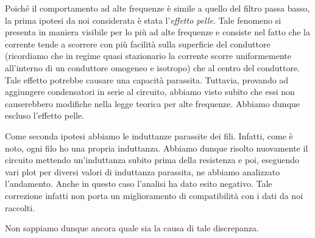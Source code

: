 Poiché il comportamento ad alte frequenze è simile a quello del filtro passa basso, la prima ipotesi da noi considerata è stata l'\emph{effetto pelle}. Tale fenomeno si presenta in maniera visibile per lo più ad alte frequenze e consiste nel fatto che la corrente tende a scorrere con più facilità sulla superficie del conduttore (ricordiamo che in regime quasi stazionario la corrente scorre uniformemente all'interno di un conduttore omogeneo e isotropo) che al centro del conduttore. Tale effetto potrebbe causare una capacità parassita. Tuttavia, provando ad aggiungere condensatori in serie al circuito, abbiamo visto subito che essi non causerebbero modifiche nella legge teorica per alte frequenze. Abbiamo dunque escluso l'effetto pelle.

Come seconda ipotesi abbiamo le induttanze parassite dei fili. Infatti, come è noto, ogni filo ho una propria induttanza. Abbiamo dunque risolto nuovamente il circuito mettendo un'induttanza subito prima della resistenza e poi, eseguendo vari plot per diversi valori di induttanza parassita, ne abbiamo analizzato l'andamento. Anche in questo caso l'analisi ha dato esito negativo. Tale correzione infatti non porta un miglioramento di compatibilità con i dati da noi raccolti.

Non sappiamo dunque ancora quale sia la causa di tale discrepanza.